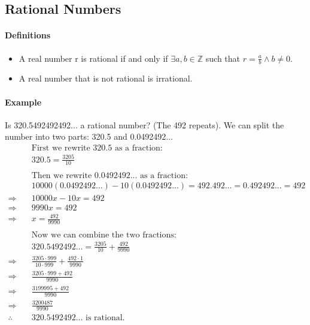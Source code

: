 \subsection{Rational Numbers}
\hrulefill

\paragraph*{Definitions}
\begin{itemize}
    \item A real number r is rational if and only if $\exists a,b \in \mathbb{Z}$ such that $r = \frac{a}{b} \land b \neq 0$.
    \item A real number that is not rational is irrational.
\end{itemize}

\paragraph*{Example}
Is 320.5492492492... a rational number? (The 492 repeats). We can split the number into two parts: 320.5 and 0.0492492...
\begin{align*}
    &\text{First we rewrite 320.5 as a fraction:}\\
    & 320.5 = \frac{3205}{10}\\
    \\
    &\text{Then we rewrite 0.0492492... as a fraction:}\\
    &10000(0.0492492...) - 10(0.0492492...) = 492.492... = 0.492492... = 492\\
    \Rightarrow \quad & 10000x - 10x = 492\\
    \Rightarrow \quad & 9990x = 492\\
    \Rightarrow \quad & x = \frac{492}{9990}\\
    \\
    &\text{Now we can combine the two fractions:}\\
    & 320.5492492... = \frac{3205}{10} + \frac{492}{9990}\\
    \Rightarrow \quad & \frac{3205 \cdot 999}{10 \cdot 999} + \frac{492 \cdot 1}{9990}\\
    \Rightarrow \quad & \frac{3205 \cdot 999 + 492}{9990}\\
    \Rightarrow \quad & \frac{3199995 + 492}{9990}\\
    \Rightarrow \quad & \frac{3200487}{9990}\\
    \therefore \quad & 320.5492492... \text{ is rational.}
\end{align*}

